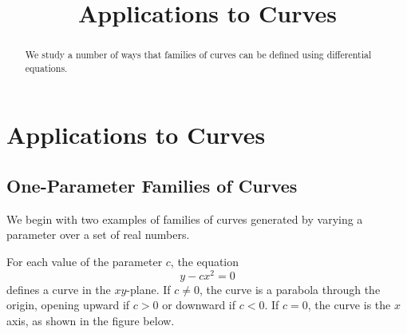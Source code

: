 \documentclass{ximera}
\title{Applications to Curves}
\begin{document}
 
\begin{abstract}
 We study a number of ways that families of curves can be defined using differential equations.
\end{abstract}
 
\maketitle
 
 
 
\section*{Applications to Curves}
 
\subsection*{One-Parameter Families of Curves}
 
We begin with two examples of families of curves generated by varying a parameter over a set of real numbers.
 
\begin{example}\label{example:4.5.1}
For each value of the parameter $c$, the equation
\begin{equation} \label{eq:4.5.1}
y-cx^2=0
\end{equation}
defines a curve in the $xy$-plane. If $c \neq 0$, the curve is a
parabola through the origin, opening upward if $c>0$ or downward if
$c<0$.   If $c=0$, the curve is the $x$ axis, as shown in the figure below.

\begin{center}
\end{center}

 
\end{example}
 
\end{document}

